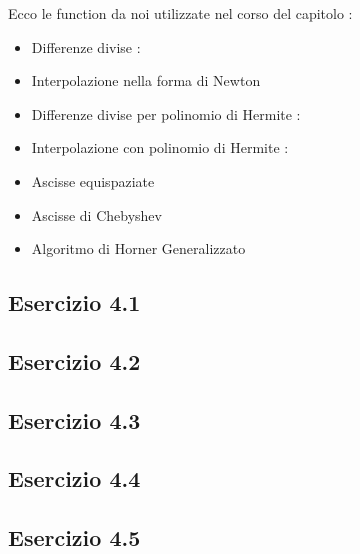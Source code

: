 Ecco le function da noi utilizzate nel corso del capitolo :

\begin{itemize}

\item Differenze divise :


\item Interpolazione nella forma di Newton


\item Differenze divise per polinomio di Hermite :


\item Interpolazione con polinomio di Hermite :


\item Ascisse equispaziate


\item Ascisse di Chebyshev


\item Algoritmo di Horner Generalizzato


\end{itemize}

\subsection{\textbf{Esercizio 4.1}}

\subsection{\textbf{Esercizio 4.2}}

\subsection{\textbf{Esercizio 4.3}}

\subsection{\textbf{Esercizio 4.4}}

\subsection{\textbf{Esercizio 4.5}}

